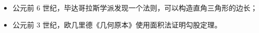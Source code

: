 \begin{itemize}
\item<+-| alert@+>
  公元前 6 世纪，毕达哥拉斯学派发现一个法则，可以构造直角三角形的边长；
\item<+-| alert@+>
  公元前 3 世纪，欧几里德《几何原本》使用面积法证明勾股定理。
\end{itemize}
